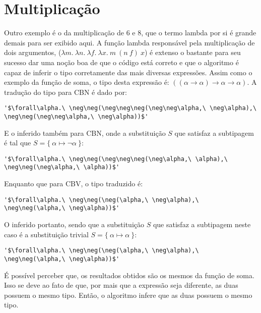 \section{Multiplicação}
Outro exemplo é o da multiplicação de 6 e 8, que o termo lambda por si é grande demais para ser exibido aqui.
A função lambda responsável pela multiplicação de dois argumentos, ($\lambda m.\ \lambda n.\ \lambda f.\ \lambda x.\ m\ (n\ f)\ x$) é extenso o bastante para seu sucesso dar uma noção boa de que o código está correto e que o algoritmo é capaz de inferir o tipo corretamente das mais diversas expressões.
Assim como o exemplo da função de soma, o tipo desta expressão é: $((\alpha \to \alpha) \to \alpha \to \alpha)$.
A tradução do tipo para CBN é dado por:
\lstset{extendedchars=false, escapeinside=''}
\begin{lstlisting}[style=output,caption={Tradução em CBN do tipo da função de soma}]
  '$\forall\alpha.\ \neg\neg(\neg\neg\neg(\neg\neg\alpha,\ \neg\alpha),\ \neg\neg(\neg\neg\alpha,\ \neg\alpha))$'
\end{lstlisting}
E o inferido também para CBN, onde a substituição $S$ que satisfaz a subtipagem é tal que $S = \{\ \alpha \mapsto \neg\alpha\ \}$:
\lstset{extendedchars=false, escapeinside=''}
\begin{lstlisting}[style=output,caption={Inferência do tipo da função de soma traduzido em CBN}]
  '$\forall\alpha.\ \neg\neg(\neg\neg\neg(\neg\alpha,\ \alpha),\ \neg\neg(\neg\alpha,\ \alpha))$'
\end{lstlisting}
Enquanto que para CBV, o tipo traduzido é:
\lstset{extendedchars=false, escapeinside=''}
\begin{lstlisting}[style=output,caption={Tradução em CBV do tipo da função de soma}]
  '$\forall\alpha.\ \neg\neg(\neg(\alpha,\ \neg\alpha),\ \neg\neg(\alpha,\ \neg\alpha))$'
\end{lstlisting}
O inferido portanto, sendo que a substituição $S$ que satisfaz a subtipagem neste caso é a substituição trivial $S = \{\ \alpha \mapsto \alpha\ \}$:
\lstset{extendedchars=false, escapeinside=''}
\begin{lstlisting}[style=output,caption={Inferência do tipo da função de soma traduzido em CBV}]
  '$\forall\alpha.\ \neg\neg(\neg(\alpha,\ \neg\alpha),\ \neg\neg(\alpha,\ \neg\alpha))$'
\end{lstlisting}
É possível perceber que, os resultados obtidos são os mesmos da função de soma.
Isso se deve ao fato de que, por mais que a expressão seja diferente, as duas possuem o mesmo tipo.
Então, o algoritmo infere que as duas possuem o mesmo tipo.

